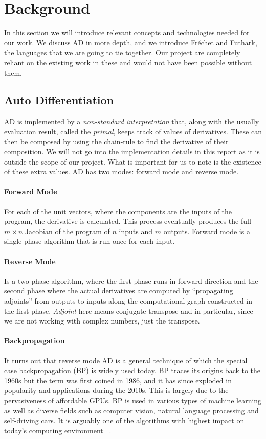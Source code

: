 \section{Background}

In this section we will introduce relevant concepts and technologies needed for
our work.  We discuss AD in more depth, and we introduce Fréchet and Futhark,
the languages that we are going to tie together.  Our project are completely
reliant on the existing work in these and would not have been possible without
them.

\subsection{Auto Differentiation}\label{sec:ad}
AD is implemented by a \textit{non-standard interpretation} that, along with the
usually evaluation result, called the \textit{primal}, keeps track of values of
derivatives.  These can then be composed by using the chain-rule to find the
derivative of their composition.
We will not go into the implementation details in this report as it is outside
the scope of our project.  What is important for us to note is the existence of
these extra values.  AD has two modes:  forward mode and reverse mode.

\paragraph{Forward Mode}  For each of the unit vectors, where the components are
the inputs of the program, the derivative is calculated.  This process
eventually produces the full \(m \times n\) Jacobian of the program of \(n\)
inputs and \(m\) outputs.  Forward mode is a single-phase algorithm that is run
once for each input.

\paragraph{Reverse Mode} Is a two-phase algorithm, where the first phase runs
in forward direction and the second phase where the actual derivatives are
computed by \enquote{propagating adjoints} from outputs to inputs along the
computational graph constructed in the first phase.  \textit{Adjoint} here means
conjugate transpose and in particular, since we are not working with complex
numbers, just the transpose.

\paragraph{Backpropagation} It turns out that reverse mode AD is a general
technique of which the special case backpropagation (BP) is widely used today.
BP traces its origins back to the 1960s but the term was first coined in 1986,
and it has since exploded in popularity and applications during the 2010s.  This
is largely due to the pervasiveness of affordable GPUs.  BP is used in various
types of machine learning as well as diverse fields such as computer vision,
natural language processing and self-driving cars.  It is arguably one of the
algorithms with highest impact on today's computing environment~
\cite[Sec. 3.3, Origins of AD and Backpropagation]{adsurvey}.




